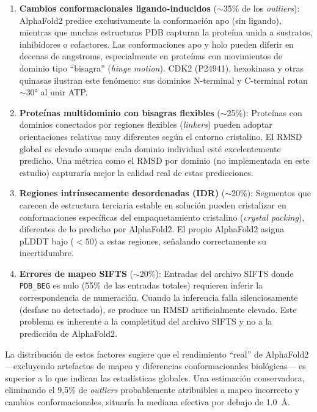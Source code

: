 \begin{enumerate}
    \item \textbf{Cambios conformacionales ligando-inducidos} ($\sim$35\% de los \textit{outliers}):
    AlphaFold2 predice exclusivamente la conformaci\'on apo (sin ligando), mientras que
    muchas estructuras PDB capturan la prote\'ina unida a sustratos, inhibidores o
    cofactores. Las conformaciones apo y holo pueden diferir en decenas de angstroms,
    especialmente en prote\'inas con movimientos de dominio tipo ``bisagra''
    (\textit{hinge motion}). CDK2 (P24941), hexokinasa y otras quinasas ilustran este
    fen\'omeno: sus dominios N-terminal y C-terminal rotan $\sim$\ang{30} al unir ATP.

    \item \textbf{Prote\'inas multidominio con bisagras flexibles} ($\sim$25\%):
    Prote\'inas con dominios conectados por regiones flexibles (\textit{linkers}) pueden
    adoptar orientaciones relativas muy diferentes seg\'un el entorno cristalino. El RMSD
    global es elevado aunque cada dominio individual est\'e excelentemente predicho.
    Una m\'etrica como el RMSD por dominio (no implementada en este estudio) capturar\'ia
    mejor la calidad real de estas predicciones.

    \item \textbf{Regiones intr\'insecamente desordenadas (IDR)} ($\sim$20\%):
    Segmentos que carecen de estructura terciaria estable en soluci\'on pueden cristalizar
    en conformaciones espec\'ificas del empaquetamiento cristalino (\textit{crystal packing}),
    diferentes de lo predicho por AlphaFold2. El propio AlphaFold2 asigna pLDDT bajo
    ($< 50$) a estas regiones, se\~nalando correctamente su incertidumbre.

    \item \textbf{Errores de mapeo SIFTS} ($\sim$20\%):
    Entradas del archivo SIFTS donde \texttt{PDB\_BEG} es nulo (55\% de las entradas totales)
    requieren inferir la correspondencia de numeraci\'on. Cuando la inferencia falla
    silenciosamente (desfase no detectado), se produce un RMSD artificialmente elevado.
    Este problema es inherente a la completitud del archivo SIFTS y no a la predicci\'on
    de AlphaFold2.
\end{enumerate}

La distribuci\'on de estos factores sugiere que el rendimiento ``real'' de AlphaFold2
---excluyendo artefactos de mapeo y diferencias conformacionales biol\'ogicas--- es
superior a lo que indican las estad\'isticas globales. Una estimaci\'on conservadora,
eliminando el 9,5\% de \textit{outliers} probablemente atribuibles a mapeo incorrecto y cambios
conformacionales, situar\'ia la mediana efectiva por debajo de \SI{1,0}{\angstrom}.


